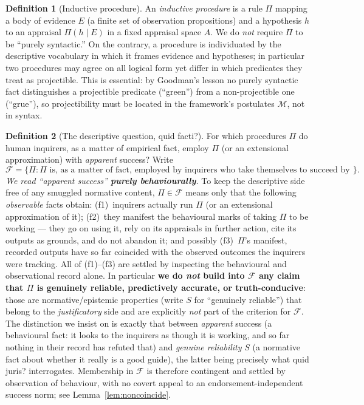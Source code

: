 \documentclass{amsart}
\theoremstyle{definition}
\newtheorem{definition}{Definition}
\theoremstyle{plain}
\theoremstyle{remark}
\begin{document}
\begin{definition}[Inductive procedure]\label{def:procedure}
An \emph{inductive procedure} is a rule $\Pi$ mapping a body of evidence $E$
(a finite set of observation propositions) and a hypothesis $h$ to an appraisal
$\Pi(h\mid E)$ in a fixed appraisal space $A$. We do \emph{not} require $\Pi$
to be ``purely syntactic.'' On the contrary, a procedure is individuated by the
descriptive vocabulary in which it frames evidence and hypotheses; in
particular two procedures may agree on all logical form yet differ in which
predicates they treat as projectible. This is essential: by Goodman's lesson
no purely syntactic fact distinguishes a projectible predicate (``green'')
from a non-projectible one (``grue''), so projectibility must be located in the
framework's postulates $\mathcal{M}$, not in syntax.
\end{definition}

\begin{definition}[The descriptive question, quid facti?]\label{def:facti}
For which procedures $\Pi$ do human inquirers, as a matter of empirical fact,
employ $\Pi$ (or an extensional approximation) with \emph{apparent} success?
Write
\[
\mathcal{F}=\{\Pi:\Pi\text{ is, as a matter of fact, employed by inquirers
who take themselves to succeed by it}\}.
\]
\emph{We read ``apparent success'' \textbf{purely behaviourally}.} To keep the
descriptive side free of any smuggled normative content, $\Pi\in\mathcal{F}$
means only that the following \emph{observable} facts obtain: (f1)~inquirers
actually run $\Pi$ (or an extensional approximation of it); (f2)~they manifest
the behavioural marks of taking $\Pi$ to be working --- they go on using it,
rely on its appraisals in further action, cite its outputs as grounds, and do
not abandon it; and possibly (f3)~$\Pi$'s manifest, recorded outputs have so far
coincided with the observed outcomes the inquirers were tracking. All of
(f1)--(f3) are settled by inspecting the behavioural and observational record
alone. In particular \textbf{we do \emph{not} build into $\mathcal{F}$ any claim
that $\Pi$ is genuinely reliable, predictively accurate, or truth-conducive}:
those are normative/epistemic properties (write $S$ for ``genuinely reliable'')
that belong to the \emph{justificatory} side and are explicitly \emph{not} part
of the criterion for $\mathcal{F}$. The distinction we insist on is exactly that
between \emph{apparent} success (a behavioural fact: it looks to the inquirers
as though it is working, and so far nothing in their record has refuted that)
and \emph{genuine reliability} $S$ (a normative fact about whether it really is
a good guide), the latter being precisely what quid juris? interrogates.
Membership in $\mathcal{F}$ is therefore contingent and settled by observation
of behaviour, with no covert appeal to an endorsement-independent success norm;
see Lemma~\ref{lem:noncoincide}.
\end{definition}
\end{document}
